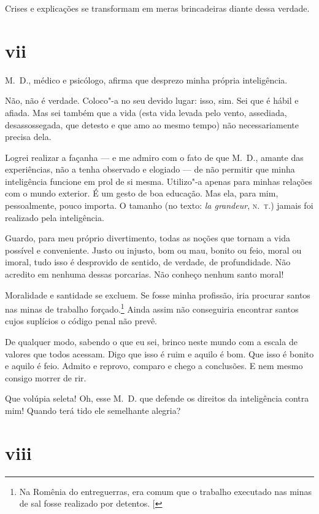 Crises e explicações se transformam em meras brincadeiras diante dessa
verdade.

\section{vii}


M.~D., médico e psicólogo, afirma que desprezo minha própria
inteligência.

Não, não é verdade. Coloco"-a no seu devido lugar: isso, sim. Sei que é
hábil e afiada. Mas sei também que a vida (esta vida levada pelo vento,
assediada, desassossegada, que detesto e que amo ao mesmo
tempo) não necessariamente precisa dela.

Logrei realizar a façanha --- e me admiro com o fato de que M.~D., amante
das experiências, não a tenha observado e elogiado --- de não permitir que
minha inteligência funcione em prol de si mesma. Utilizo"-a apenas para
minhas relações com o mundo exterior. É um gesto de boa educação. Mas
ela, para mim, pessoalmente, pouco importa. O tamanho (no texto: \emph{la
grandeur}, \textsc{n.~t.}) jamais foi realizado pela inteligência.

Guardo, para meu próprio divertimento, todas as noções que tornam a vida
possível e conveniente. Justo ou injusto, bom ou mau, bonito ou feio,
moral ou imoral, tudo isso é desprovido de sentido, de verdade, de
profundidade. Não acredito em nenhuma dessas porcarias. Não
conheço nenhum santo moral!

Moralidade e santidade se excluem. Se fosse minha profissão,
iria procurar santos nas minas de trabalho
forçado.\footnote{Na Romênia do entreguerras, era comum que o trabalho executado nas minas de sal fosse realizado por detentos. {[}\versal{N.~T.}{]}} Ainda
assim não conseguiria encontrar santos cujos suplícios o código
penal não prevê.

De qualquer modo, sabendo o que eu sei, brinco neste mundo com a escala
de valores que todos acessam. Digo que isso é ruim e aquilo é bom. Que
isso é bonito e aquilo é feio. Admito e reprovo, comparo e chego a
conclusões. E nem mesmo consigo morrer de rir.

Que volúpia seleta! Oh, esse M.~D. que defende os direitos da
inteligência contra mim! Quando terá tido ele semelhante alegria?

\section{viii}

